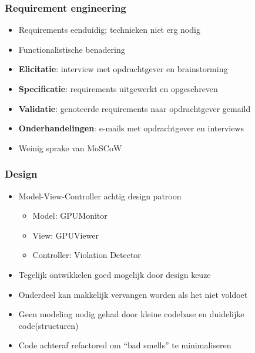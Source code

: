 \documentclass{beamer}
\begin{document}
\begin{frame}
\frametitle{Requirement engineering}
    \begin{itemize}
        \item Requirements eenduidig; technieken niet erg nodig
        \vspace{+2mm}

        \item Functionalistische benadering  %
        \vspace{+2mm}

        \item \textbf{Elicitatie}: interview met opdrachtgever en brainstorming
        \item \textbf{Specificatie}: requirements uitgewerkt en opgeschreven
        \item \textbf{Validatie}: genoteerde requirements naar opdrachtgever gemaild
        \item \textbf{Onderhandelingen}: e-mails met opdrachtgever en interviews
        \vspace{+2mm}

        \item Weinig sprake van MoSCoW  %
    \end{itemize}
\end{frame}


\begin{frame}
\frametitle{Design}
    \begin{itemize}
        \item Model-View-Controller achtig design patroon  %
        \begin{itemize}
            \item Model: GPUMonitor  %
            \item View: GPUViewer  %
            \item Controller: Violation Detector  %
        \end{itemize}
        \vspace{+2mm}

        \item Tegelijk ontwikkelen goed mogelijk door design keuze
        \item Onderdeel kan makkelijk vervangen worden als het niet voldoet
        \vspace{+2mm}

        \item Geen modeling nodig gehad door kleine codebase en duidelijke code(structuren)
        \vspace{+2mm}

        \item Code achteraf refactored om ``bad smells'' te minimaliseren
    \end{itemize}
\end{frame}
\end{document}
